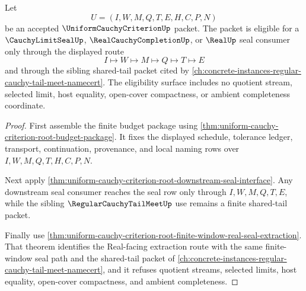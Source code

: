 \begin{theorem}
\label{thm:uniform-cauchy-criterion-root-budget-seal-eligibility}
Let
$$
U=(I,W,M,Q,T,E,H,C,P,N)
$$
be an accepted $\UniformCauchyCriterionUp$ packet. The packet is eligible for a $\CauchyLimitSealUp$, $\RealCauchyCompletionUp$, or $\RealUp$ seal consumer only through the displayed route
$$
I \longmapsto W \longmapsto M \longmapsto Q \longmapsto T \longmapsto E
$$
and through the sibling shared-tail packet cited by \autoref{ch:concrete-instances-regular-cauchy-tail-meet-namecert}. The eligibility surface includes no quotient stream, selected limit, host equality, open-cover compactness, or ambient completeness coordinate.
\end{theorem}
\begin{proof}
First assemble the finite budget package using \autoref{thm:uniform-cauchy-criterion-root-budget-package}. It fixes the displayed schedule, tolerance ledger, transport, continuation, provenance, and local naming rows over $I,W,M,Q,T,H,C,P,N$.

Next apply \autoref{thm:uniform-cauchy-criterion-root-downstream-seal-interface}. Any downstream seal consumer reaches the seal row only through $I,W,M,Q,T,E$, while the sibling $\RegularCauchyTailMeetUp$ use remains a finite shared-tail packet.

Finally use \autoref{thm:uniform-cauchy-criterion-root-finite-window-real-seal-extraction}. That theorem identifies the Real-facing extraction route with the same finite-window seal path and the shared-tail packet of \autoref{ch:concrete-instances-regular-cauchy-tail-meet-namecert}, and it refuses quotient streams, selected limits, host equality, open-cover compactness, and ambient completeness.
\end{proof}

